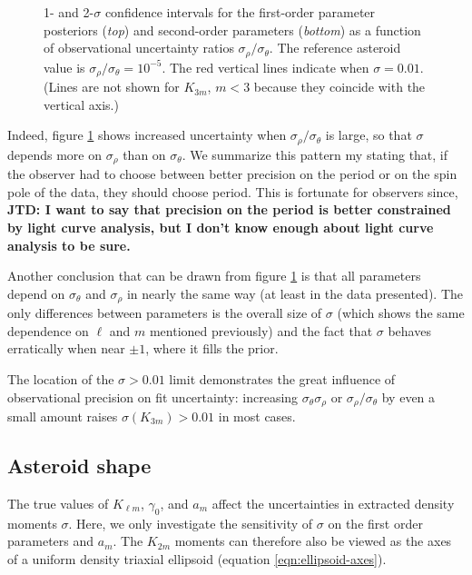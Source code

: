 \documentclass[fleqn,usenatbib]{mnras}
\newcommand{\jtd}[1]{ {\bf{\color{red} JTD: #1}} }
\begin{document}
\begin{figure}
  \caption{1- and 2-$\sigma$ confidence intervals for the first-order parameter posteriors (\textit{top}) and second-order parameters (\textit{bottom}) as a function of observational uncertainty ratios $\sigma_\rho / \sigma_\theta$. The reference asteroid value is $\sigma_\rho/ \sigma_\theta =10^{-5}$. The red vertical lines indicate when $\sigma = 0.01$. (Lines are not shown for $K_{3m}$, $m < 3$ because they coincide with the vertical axis.)}
  \label{fig:scan-ratio}
\end{figure}

Indeed, figure  \ref{fig:scan-ratio} shows increased uncertainty when $\sigma_\rho/\sigma_\theta$ is large, so that $\sigma$ depends more on $\sigma_\rho$ than on $\sigma_\theta$. We summarize this pattern my stating that, if the observer had to choose between better precision on the period or on the spin pole of the data, they should choose period. This is fortunate for observers since, \jtd{I want to say that precision on the period is better constrained by light curve analysis, but I don't know enough about light curve analysis to be sure.}

Another conclusion that can be drawn from figure \ref{fig:scan-ratio} is that all parameters depend on $\sigma_\theta$ and $\sigma_\rho$ in nearly the same way (at least in the data presented). The only differences between parameters is the overall size of $\sigma$ (which shows the same dependence on $\ell$ and $m$ mentioned previously) and the fact that $\sigma$ behaves erratically when near $\pm 1$, where it fills the prior.

The location of the $\sigma > 0.01$ limit demonstrates the great influence of observational precision on fit uncertainty: increasing $\sigma_\theta \sigma_\rho$ or $\sigma_\rho / \sigma_\theta$ by even a small amount raises $\sigma(K_{3m}) > 0.01$ in most cases.



\subsection{Asteroid shape}
\label{sec:scan-shape}

The true values of $K_{\ell m}$, $\gamma_0$, and $a_m$ affect the uncertainties in extracted density moments $\sigma$. Here, we only investigate the sensitivity of $\sigma$ on the first order parameters and $a_m$. The $K_{2m}$ moments can therefore also be viewed as the axes of a uniform density triaxial ellipsoid (equation \ref{eqn:ellipsoid-axes}).
\end{document}
